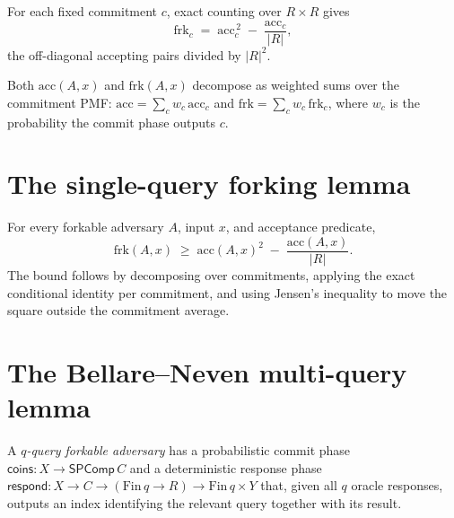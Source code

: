 \begin{lemma}
  \label{lem:cond-fork-prob-eq}
  \leanok
  For each fixed commitment $c$, exact counting over $R \times R$ gives
  \[
    \mathrm{frk}_c \;=\; \mathrm{acc}_c^{\,2} \;-\; \frac{\mathrm{acc}_c}{\lvert R\rvert},
  \]
  the off-diagonal accepting pairs divided by $\lvert R\rvert^2$.
\end{lemma}

\begin{lemma}
  \label{lem:fork-decompose}
  \leanok
  Both $\mathrm{acc}(A,x)$ and $\mathrm{frk}(A,x)$ decompose as weighted sums over
  the commitment PMF: $\mathrm{acc} = \sum_c w_c\,\mathrm{acc}_c$ and
  $\mathrm{frk} = \sum_c w_c\,\mathrm{frk}_c$, where $w_c$ is the probability the
  commit phase outputs $c$.
\end{lemma}

\section{The single-query forking lemma}

\begin{theorem}[Forking lemma, $q = 1$]
  \label{thm:fork-success-ge}
  \leanok
  For every forkable adversary $A$, input $x$, and acceptance predicate,
  \[
    \mathrm{frk}(A,x) \;\geq\;
    \mathrm{acc}(A,x)^2 \;-\; \frac{\mathrm{acc}(A,x)}{\lvert R\rvert}.
  \]
  The bound follows by decomposing over commitments, applying the exact
  conditional identity per commitment, and using Jensen's inequality to move the
  square outside the commitment average.
\end{theorem}

\section{The Bellare--Neven multi-query lemma}

\begin{definition}
  \label{def:qforkable-adversary}
  \leanok
  A \emph{$q$-query forkable adversary} has a probabilistic commit phase
  $\mathsf{coins} : X \to \mathsf{SPComp}\,C$ and a deterministic response phase
  $\mathsf{respond} : X \to C \to (\mathrm{Fin}\,q \to R) \to \mathrm{Fin}\,q \times Y$
  that, given all $q$ oracle responses, outputs an index identifying the relevant
  query together with its result.
\end{definition}

